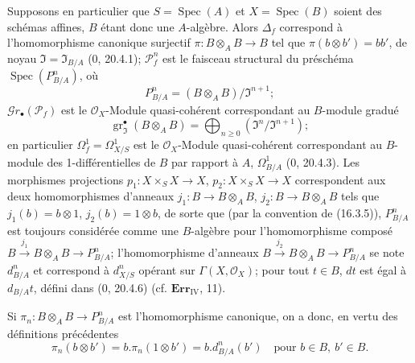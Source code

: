 \begin{env}[16.3.7]
\label{IV.16.3.7}
Supposons en particulier que $S=\operatorname{Spec}(A)$ et
$X=\operatorname{Spec}(B)$ soient des schémas affines, $B$ étant donc une
$A$-algèbre. Alors $\Delta_f$ correspond à l'homomorphisme canonique surjectif
$\pi:B\otimes_A B\to B$ tel que $\pi(b\otimes b')=bb'$, de noyau
$\mathfrak{I}=\mathfrak{I}_{B/A}$ (0, 20.4.1); $\mathscr{P}_f^n$ est le faisceau
structural du préschéma $\operatorname{Spec}(P_{B/A}^n)$, où
\[
  P_{B/A}^n=(B\otimes_A B)/\mathfrak{I}^{n+1};
\]
$\mathscr{G}r_\bullet(\mathscr{P}_f)$ est le $\mathcal{O}_X$-Module
quasi-cohérent correspondant au $B$-module gradué
\[
  \operatorname{gr}_{\mathfrak{I}}^\bullet(B\otimes_A B)
  =\bigoplus_{n\geq 0}(\mathfrak{I}^n/\mathfrak{I}^{n+1});
\]
en particulier $\Omega_f^1=\Omega_{X/S}^1$ est le $\mathcal{O}_X$-Module
quasi-cohérent correspondant au $B$-module des 1-différentielles de $B$ par
rapport à $A$, $\Omega_{B/A}^1$ (0, 20.4.3). Les morphismes projections
$p_1:X\times_S X\to X$, $p_2:X\times_S X\to X$ correspondent aux deux
homomorphismes d'anneaux $j_1:B\to B\otimes_A B$, $j_2:B\to B\otimes_A B$
tels que $j_1(b)=b\otimes 1$, $j_2(b)=1\otimes b$, de sorte que (par la
convention de (16.3.5)), $P_{B/A}^n$ est toujours considérée comme une
$B$-algèbre pour l'homomorphisme composé
$B\xrightarrow{j_1}B\otimes_A B\to P_{B/A}^n$; l'homomorphisme d'anneaux
$B\xrightarrow{j_2}B\otimes_A B\to P_{B/A}^n$ se note $d_{B/A}^n$ et correspond
à $d_{X/S}^n$ opérant sur $\Gamma(X,\mathcal{O}_X)$; pour tout $t\in B$, $dt$
est égal à $d_{B/A}t$, défini dans (0, 20.4.6) (cf. $\mathbf{Err}_{\mathrm{IV}}$,
11).

Si $\pi_n:B\otimes_A B\to P_{B/A}^n$ est l'homomorphisme canonique, on a donc,
en vertu des définitions précédentes
\[
  \pi_n(b\otimes b')=b.\pi_n(1\otimes b')=b.d_{B/A}^n(b')
  \quad\text{pour }b\in B,\ b'\in B.
  \tag{16.3.7.1}
  \label{IV.16.3.7.1}
\]
\end{env}

